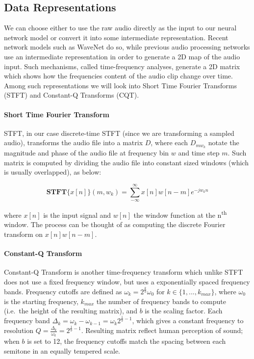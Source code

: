 \documentclass[12pt,a4paper,]{report}
\begin{document}
\hypertarget{data-representations}{%
\subsection{Data Representations}\label{data-representations}}

We can choose either to use the raw audio directly as the input to our
neural network model or convert it into some intermediate
representation. Recent network models such as WaveNet do so, while
previous audio processing networks use an intermediate representation in
order to generate a 2D map of the audio input. Such mechanisms, called
time-frequency analyses, generate a 2D matrix which shows how the
frequencies content of the audio clip change over time. Among such
representations we will look into Short Time Fourier Transforms (STFT)
and Constant-Q Transforms (CQT).

\paragraph{Short Time Fourier Transform}

STFT, in our case discrete-time STFT (since we are transforming a
sampled audio), transforms the audio file into a matrix \(D\), where
each \(D_{mw_{k}}\) notate the magnitude and phase of the audio file at
frequency bin \(w\) and time step \(m\). Such matrix is computed by
dividing the audio file into constant sized windows (which is usually
overlapped), as below:

\begin{equation}
    \mathbf{STFT}\{x[n]\}(m, w_k) = \sum_{-\infty}^{\infty} x[n]w[n - m]e^{-jw_kn}
\end{equation}

where \(x[n]\) is the input signal and \(w[n]\) the window function at
the n\textsuperscript{th} window. The process can be thought of as
computing the discrete Fourier transform on \(x[n]w[n - m]\).

\paragraph{Constant-Q Transform}

Constant-Q Transform is another time-frequency transform which unlike
STFT does not use a fixed frequency window, but uses a exponentially
spaced frequency bands. Frequency cutoffs are defined as
\(\omega_k = 2^{\frac{k}{b}} \omega_0\) for
\(k \in \{ 1, ..., k_{max}\}\), where \(\omega_0\) is the starting
frequency, \(k_{max}\) the number of frequency bands to compute
(i.e.~the height of the resulting matrix), and \(b\) is the scaling
factor. Each frequency band
\(\Delta_k = \omega_k - \omega_{k-1} = \omega_k 2^{\frac{1}{b} - 1}\),
which gives a constant frequency to resolution
\(Q = \frac{\Delta_k}{\omega_k} = 2^{\frac{1}{b} -1}\). Resulting matrix
reflect human perception of sound; when \(b\) is set to 12, the
frequency cutoffs match the spacing between each semitone in an equally
tempered scale.
\end{document}
